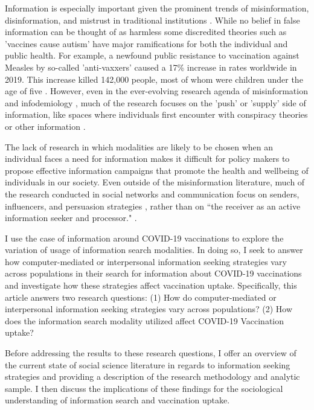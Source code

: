 Information is especially important given the prominent trends of
misinformation, disinformation, and mistrust in traditional institutions
\citep{starbird19, kata10}. While no belief in false information can be thought of as
harmless \citep{douglas21} some discredited theories such as 'vaccines cause autism'
have major ramifications for both the individual and public health.
For example, a newfound public resistance to vaccination
against Measles by so-called 'anti-vaxxers' caused a 17\% increase in rates
worldwide in 2019. This increase killed  142,000 people, most of whom were
children under the age of five \citep{givetash19}. However, even in the ever-evolving
research agenda of misinformation and infodemiology \citep{eysenbach02}, much of the
research focuses on the 'push' or 'supply' side of information, like spaces where
individuals first encounter with conspiracy theories or other information
\citep{johnsonOnlineCompetitionPro2020, broniatowski_etal20}.

The lack of research in which modalities are likely to be chosen when an
individual faces a need for information makes it difficult for policy makers to
propose effective information campaigns that promote the health and wellbeing of
individuals in our society. Even outside of the misinformation literature, much
of the research conducted in social networks and communication focus on senders,
influencers, and persuasion strategies 
\citep{mertonManifestLatentFunctions1968, katzPersonalInfluencePart1955, lazarsfeldPeopleChoice1944},
rather than on “the receiver as an active information seeker and processor." 
\citep{johnsonComprehensiveModelCancerRelated1993}
\citep[for an exception, see]{eysenbach09}.

I use the case of information around COVID-19 vaccinations to explore the
variation of usage of information search modalities. In doing so, I seek to answer
how computer-mediated or interpersonal information seeking strategies vary
across populations in their search for information about COVID-19 vaccinations
and investigate how these strategies affect vaccination uptake. Specifically, this article 
answers two research questions: (1) How do computer-mediated or interpersonal information seeking
strategies vary across populations? (2) How does the information search modality utilized 
affect COVID-19 Vaccination uptake? 

Before addressing the results to these research questions, I offer an overview of the
current state of social science literature in regards to information seeking
strategies and providing a description of the research methodology and
analytic sample. I then discuss the implications of these findings for the
sociological understanding of information search and vaccination uptake.

